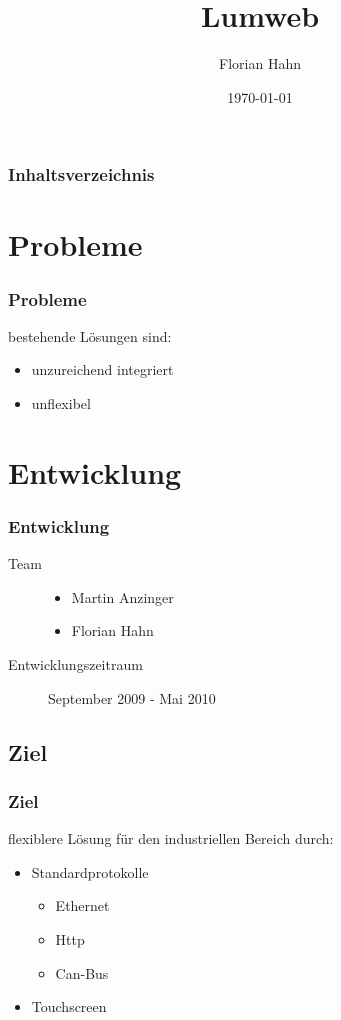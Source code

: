 \documentclass{beamer}
\begin{document}
\title{Lumweb}  
\author{Florian Hahn}
\date{\today} 

\begin{frame}
\titlepage
\end{frame}

\begin{frame}\frametitle{Inhaltsverzeichnis}\tableofcontents
\end{frame} 


\section{Probleme} 
\begin{frame}\frametitle{Probleme}
  bestehende Lösungen sind:\\
  \begin{itemize}
    \item unzureichend integriert
    \item unflexibel
  \end{itemize}
\end{frame}



\section{Entwicklung} 
\begin{frame}\frametitle{Entwicklung}
  \begin{description}
    \item [Team]
      \begin{itemize}
        \item Martin Anzinger
        \item Florian Hahn
      \end{itemize}
    \item[Entwicklungszeitraum] September 2009 - Mai 2010
  \end{description}
\end{frame}

\subsection{Ziel}
\begin{frame}\frametitle{Ziel}
  flexiblere Lösung für den industriellen Bereich durch:
  \begin{itemize}
    \item Standardprotokolle
       \begin{itemize}
         \item Ethernet
         \item Http
         \item Can-Bus
       \end{itemize}
    \item Touchscreen
  \end{itemize}
\end{frame}
\end{document}
